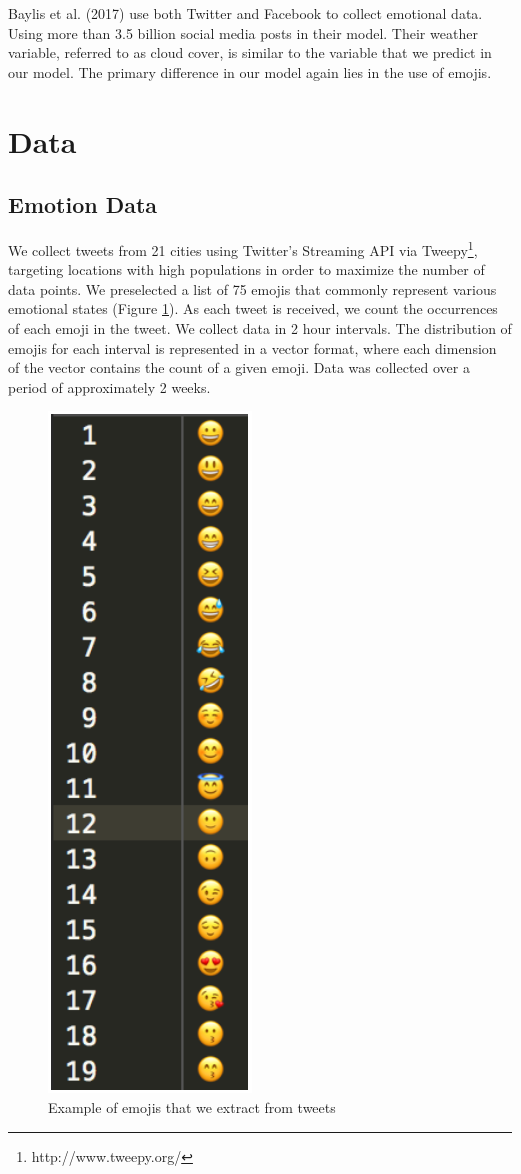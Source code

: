 \documentclass[12pt]{article}
\begin{document}
Baylis et al. (2017) use both Twitter and Facebook to collect emotional data. Using more than 3.5 billion social media posts in their model.\cite{Baylis2017} Their weather variable, referred to as cloud cover, is similar to the variable that we predict in our model. The primary difference in our model again lies in the use of emojis.

\section{Data}

\subsection{Emotion Data}
We collect tweets from 21 cities using Twitter's Streaming API via Tweepy\footnote{http://www.tweepy.org/}, targeting locations with high populations in order to maximize the number of data points. We preselected a list of 75 emojis that commonly represent various emotional states (Figure \ref{fig:emojis}). As each tweet is received, we count the occurrences of each emoji in the tweet. We collect data in 2 hour intervals. The distribution of emojis for each interval is represented in a vector format, where each dimension of the vector contains the count of a given emoji. Data was collected over a period of approximately 2 weeks.

\begin{figure}[t]
\includegraphics[scale=0.7]{emojiexample}
\centering
\caption{Example of emojis that we extract from tweets}
\label{fig:emojis}
\end{figure}
\end{document}
